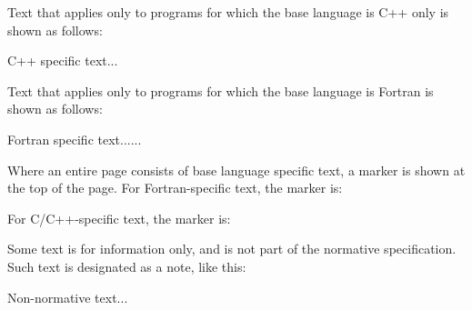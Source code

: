 Text that applies only to programs for which the base language is C++ only is shown as
follows:

\begin{cppspecific}
C++ specific text...
\end{cppspecific}

Text that applies only to programs for which the base language is Fortran is shown as follows:

\begin{fortranspecific}
Fortran specific text......
\end{fortranspecific}

Where an entire page consists of base language specific text, a marker is shown
at the top of the page.  For Fortran-specific text, the marker is:

\bigskip
{}
\bigskip

For C/C++-specific text, the marker is:

\bigskip
{}
\bigskip

Some text is for information only, and is not part of the normative specification. Such
text is designated as a note, like this:

\begin{note}
Non-normative text...
\end{note}

